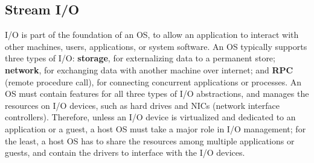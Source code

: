 \subsection{Stream I/O}
\label{sec:abi:streams}



I/O is part of the foundation
of an OS, to allow an application to interact with
other machines, users, applications, or system software.
An OS typically supports three types of I/O:
{\bf storage}, for externalizing data to a permanent store;
{\bf network}, for exchanging data with another machine over internet;
and {\bf RPC} (remote procedure call),
for connecting concurrent applications or processes.
An OS must contain features for all three types of I/O abstractions,
and manages the resources on I/O devices, such as hard drives and NICs (network interface controllers).
Therefore, unless an I/O device is virtualized and dedicated to
an application or a guest,
a host OS must take a major role in I/O management;
for the least, a host OS has to share the resources among multiple applications or guests,
and contain the drivers to interface with the I/O devices.








